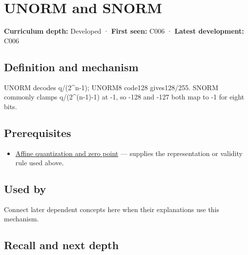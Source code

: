 \hypertarget{appendix-b2402c453dac}{}\label{referencestart:appendix-b2402c453dac}
\section{UNORM and SNORM}\label{appendix-b2402c453dac-unorm-and-snorm}

\hypertarget{appendix-b2402c453dac-unorm-and-snorm}{}

\textbf{Curriculum depth:} Developed · \textbf{First seen:} C006 · \textbf{Latest development:} C006

\begin{allmightroledefinition}

\subsection{Definition and mechanism}\label{appendix-b2402c453dac-definition-and-mechanism}

\hypertarget{appendix-b2402c453dac-definition-and-mechanism}{}

UNORM decodes q/(2\^{}n-1); UNORM8 code128 gives128/255. SNORM commonly clamps q/(2\^{}(n-1)-1) at -1, so -128 and -127 both map to -1 for eight bits.

\end{allmightroledefinition}

\subsection{Prerequisites}\label{appendix-b2402c453dac-prerequisites}

\hypertarget{appendix-b2402c453dac-prerequisites}{}

\begin{itemize}
\tightlist
\item
  \hyperref[appendix-d5da3eaabaef]{Affine quantization and zero point} --- supplies the representation or validity rule used above.
\end{itemize}

\subsection{Used by}\label{appendix-b2402c453dac-used-by}

\hypertarget{appendix-b2402c453dac-used-by}{}

Connect later dependent concepts here when their explanations use this mechanism.

\subsection{Recall and next depth}\label{appendix-b2402c453dac-recall-and-next-depth}


